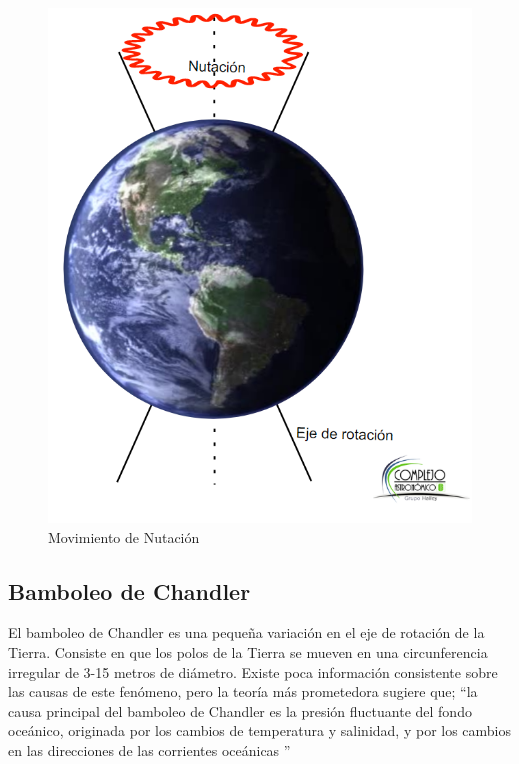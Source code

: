 \documentclass[10pt,a4paper]{article}
\begin{document}
\begin{figure}[H]
\centering
\includegraphics[scale=0.45]{Imagenes/Nutacion_01} 
\caption{Movimiento de Nutación}
\label{m_traslacion}
\end{figure} 

\subsection{Bamboleo de Chandler}
El bamboleo de Chandler es una pequeña variación en el eje de rotación de la Tierra. Consiste en que los polos de la Tierra se mueven en una circunferencia irregular de 3-15 metros de diámetro. Existe poca información consistente sobre las causas de este fenómeno, pero la teoría más prometedora sugiere que; ``la causa principal del bamboleo de Chandler es la presión fluctuante del fondo oceánico, originada por los cambios de temperatura y salinidad, y por los cambios en las direcciones de las corrientes oceánicas ''
\end{document}
